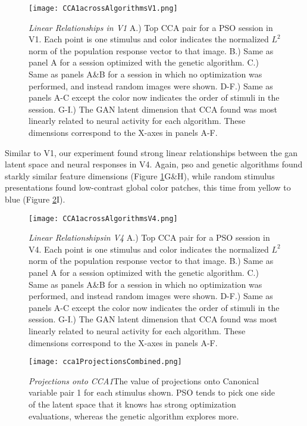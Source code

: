 \begin{figure}
	\centering
	\texttt{[image: CCA1acrossAlgorithmsV1.png]}
	{\caption{{\it Linear Relationships in V1} A.) Top CCA pair for a PSO session in V1. Each point is one stimulus and color indicates the normalized $L^2$ norm of the population response vector to that image. B.) Same as panel A for a session optimized with the genetic algorithm. C.) Same as panels A\&B for a session in which no optimization was performed, and instead random images were shown. D-F.) Same as panels A-C except the color now indicates the order of stimuli in the session. G-I.) The GAN latent dimension that CCA found was most linearly related to neural activity for each algorithm. These dimensions correspond to the X-axes in panels A-F.}
	\label{fig:cca1V1}}
\end{figure}

Similar to V1, our experiment found strong linear relationships between the \gls{gan} latent space and neural responses in V4. Again, \gls{pso} and genetic algorithms found starkly similar feature dimensions (Figure \ref{fig:cca1V1}G\&H), while random stimulus presentations found low-contrast global color patches, this time from yellow to blue (Figure \ref{fig:cca1V4}I).

\begin{figure}
	\centering
	\texttt{[image: CCA1acrossAlgorithmsV4.png]}
	{\caption{{\it Linear Relationshipsin V4} A.) Top CCA pair for a PSO session in V4. Each point is one stimulus and color indicates the normalized $L^2$ norm of the population response vector to that image. B.) Same as panel A for a session optimized with the genetic algorithm. C.) Same as panels A\&B for a session in which no optimization was performed, and instead random images were shown. D-F.) Same as panels A-C except the color now indicates the order of stimuli in the session. G-I.) The GAN latent dimension that CCA found was most linearly related to neural activity for each algorithm. These dimensions correspond to the X-axes in panels A-F.}
	\label{fig:cca1V4}}
\end{figure}




\begin{figure}
	\centering
	\texttt{[image: cca1ProjectionsCombined.png]}
	{\caption{{\it Projections onto CCA1}The value of projections onto Canonical variable pair 1 for each stimulus shown. PSO tends to pick one side of the latent space that it knows has strong optimization evaluations, whereas the genetic algorithm explores more.}
	\label{fig:ccaProjections}}
\end{figure}

